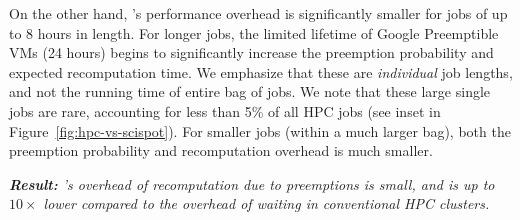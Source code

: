 On the other hand, \sysname's performance overhead is significantly smaller for jobs of up to 8 hours in length.
For longer jobs, the limited lifetime of Google Preemptible VMs (24 hours) begins to significantly increase the preemption probability and expected recomputation time.
We emphasize that these are \emph{individual} job lengths, and not the running time of entire bag of jobs.
We note that these large single jobs are rare, accounting for less than 5\% of all HPC jobs (see inset in Figure~\ref{fig:hpc-vs-scispot}).
For smaller jobs (within a much larger bag), both the preemption probability and recomputation overhead is much smaller. 

\noindent \emph{\textbf{Result:} \sysname's overhead of recomputation due to preemptions is small, and is up to $10\times$ lower compared to the overhead of waiting in conventional HPC clusters. }








